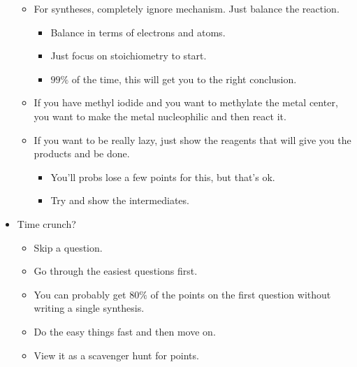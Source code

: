 \documentclass[../notes.tex]{subfiles}
\begin{document}
\begin{itemize}
\begin{itemize}
        \item For syntheses, completely ignore mechanism. Just balance the reaction.
        \begin{itemize}
            \item Balance in terms of electrons and atoms.
            \item Just focus on stoichiometry to start.
            \item $99\%$ of the time, this will get you to the right conclusion.
        \end{itemize}
        \item If you have methyl iodide and you want to methylate the metal center, you want to make the metal nucleophilic and then react it.
        \item If you want to be really lazy, just show the reagents that will give you the products and be done.
        \begin{itemize}
            \item You'll probs lose a few points for this, but that's ok.
            \item Try and show the intermediates.
        \end{itemize}
    \end{itemize}
    \item Time crunch?
    \begin{itemize}
        \item Skip a question.
        \item Go through the easiest questions first.
        \item You can probably get $80\%$ of the points on the first question without writing a single synthesis.
        \item Do the easy things fast and then move on.
        \item View it as a scavenger hunt for points.
    \end{itemize}
\end{itemize}
\end{document}
